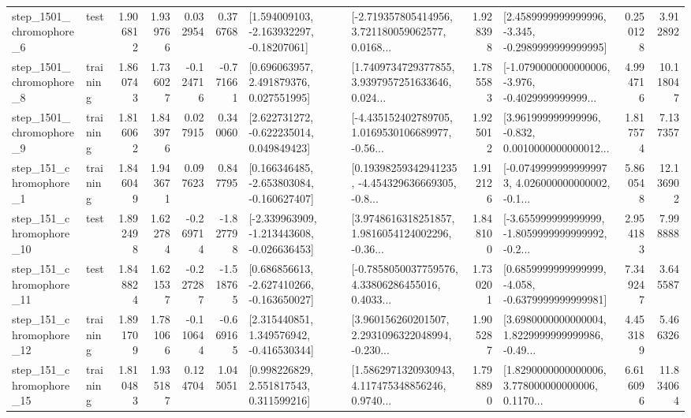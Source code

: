 \begin{tabular}{llrrrrllrlrr}
  step\_1501\_chromophore\_6 &      test &      1.906812 &    1.939766 &      0.032954 &  0.376768 &    [1.594009103, -2.163932297, -0.18207061] &  [-2.719357805414956, 3.721180059062577, 0.0168... &       1.928398 &  [2.4589999999999996, -3.345, -0.2989999999999995] &            0.250128 &          3.912892 \\
  step\_1501\_chromophore\_8 &  training &      1.860743 &    1.736027 &     -0.124716 & -0.771661 &     [0.696063957, 2.491879376, 0.027551995] &  [1.7409734729377855, 3.9397957251633646, 0.024... &       1.785583 &  [-1.0790000000000006, -3.976, -0.4029999999999... &            4.994716 &         10.118047 \\
  step\_1501\_chromophore\_9 &  training &      1.816062 &    1.843976 &      0.027915 &  0.340060 &    [2.622731272, -0.622235014, 0.049849423] &  [-4.435152402789705, 1.0169530106689977, -0.56... &       1.925012 &  [3.961999999999996, -0.832, 0.0010000000000012... &            1.817574 &          7.137357 \\
   step\_151\_chromophore\_1 &  training &      1.846049 &    1.943671 &      0.097623 &  0.847795 &   [0.166346485, -2.653803084, -0.160627407] &  [0.19398259342941235, -4.454329636669305, -0.8... &       1.912126 &  [-0.07499999999999973, 4.026000000000002, -0.1... &            5.860548 &         12.136902 \\
  step\_151\_chromophore\_10 &      test &      1.892498 &    1.622784 &     -0.269714 & -1.827798 &  [-2.339963909, -1.213443608, -0.026636453] &  [3.9748616318251857, 1.9816054124002296, -0.36... &       1.848100 &  [-3.655999999999999, -1.8059999999999992, -0.2... &            2.954183 &          7.998888 \\
  step\_151\_chromophore\_11 &      test &      1.848824 &    1.621537 &     -0.227287 & -1.518765 &   [0.686856613, -2.627410266, -0.163650027] &  [-0.7858050037759576, 4.33806286455016, 0.4033... &       1.730201 &  [0.6859999999999999, -4.058, -0.6379999999999981] &            7.349247 &          3.645587 \\
  step\_151\_chromophore\_12 &  training &      1.891709 &    1.781066 &     -0.110644 & -0.669165 &    [2.315440851, 1.349576942, -0.416530344] &  [3.960156260201507, 2.2931096322048994, -0.230... &       1.905287 &  [3.6980000000000004, 1.8229999999999986, -0.49... &            4.453189 &          5.466326 \\
  step\_151\_chromophore\_15 &  training &      1.810483 &    1.935187 &      0.124704 &  1.045051 &     [0.998226829, 2.551817543, 0.311599216] &  [1.5862971320930943, 4.117475348856246, 0.9740... &       1.798890 &  [1.8290000000000006, 3.778000000000006, 0.1170... &            6.616096 &         11.834064 \\

\end{tabular}
